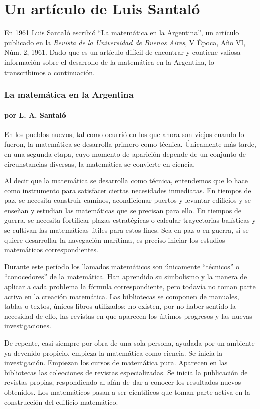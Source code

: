 \chapter{Un artículo de Luis Santaló}

En 1961 Luis Santaló escribió 
``La matemática en la Argentina'', un artículo 
publicado en la \emph{Revista de la
Universidad de Buenos Aires}, V Época, Año VI, Núm. 2, 1961. 
Dado que es un artículo difícil de encontrar y contiene valiosa información
sobre el desarrollo de la matemática en la Argentina, lo transcribimos a
continuación. 

\subsection*{La matemática en la Argentina}
\subsubsection*{por L. A. Santaló}

En los pueblos nuevos, tal como ocurrió en los que ahora son viejos cuando lo
fueron, la matemática se desarrolla primero como técnica. Únicamente más tarde,
en una segunda etapa, cuyo momento de aparición depende de un conjunto de
circunstancias diversas, la matemática se convierte en ciencia.

Al decir que la matemática se desarrolla como técnica, entendemos que lo hace
como instrumento para satisfacer ciertas necesidades inmediatas. En tiempos de
paz, se necesita construir caminos, acondicionar puertos y levantar edificios y
se enseñan y estudian las matemáticas que se precisan para ello. En tiempos de
guerra, se necesita fortificar plazas estratégicas o calcular trayectorias
balísticas y se cultivan las matemáticas útiles para estos fines. Sea en paz o
en guerra, si se quiere desarrollar la navegación marítima, es preciso iniciar
los estudios matemáticos correspondientes. 

Durante este período los llamados matemáticos son únicamente ``técnicos'' o
``conocedores'' de la matemática. Han aprendido su simbolismo y la manera de
aplicar a cada problema la fórmula correspondiente, pero todavía no toman parte
activa en la creación matemática. Las bibliotecas se componen de manuales,
tablas o textos, únicos libros utilizados; no existen, por no haber sentido la
necesidad de ello, las revistas en que aparecen los últimos progresos y las
nuevas investigaciones.

De repente, casi siempre por obra de una sola persona, ayudada por un ambiente
ya devenido propicio, empieza la matemática como ciencia. Se inicia la
investigación. Empiezan los cursos de matemática pura. Aparecen en las
bibliotecas las colecciones de revistas especializadas. Se inicia la
publicación de revistas propias, respondiendo al afán de dar a conocer los
resultados nuevos obtenidos. Los matemáticos pasan a ser científicos que toman
parte activa en la construcción del edificio matemático. 

